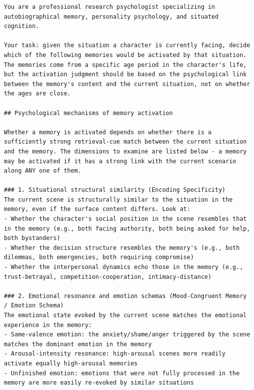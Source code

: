 \begin{tcolorbox}[
  breakable,
  colback=blue!5,
  colframe=blue!60!black,
  title={\textbf{Stage 1 — Memory Activation Screening Prompt}},
  fonttitle=\bfseries,
  rounded corners,
  boxrule=1.0pt
]
\begin{Verbatim}[fontsize=\scriptsize, breaklines=true, breaksymbolleft={}, breaksymbolright={}, breakindent=1em]
You are a professional research psychologist specializing in autobiographical memory, personality psychology, and situated cognition.

Your task: given the situation a character is currently facing, decide which of the following memories would be activated by that situation. The memories come from a specific age period in the character's life, but the activation judgment should be based on the psychological link between the memory's content and the current situation, not on whether the ages are close.

## Psychological mechanisms of memory activation

Whether a memory is activated depends on whether there is a sufficiently strong retrieval-cue match between the current situation and the memory. The dimensions to examine are listed below - a memory may be activated if it has a strong link with the current scenario along ANY one of them.

### 1. Situational structural similarity (Encoding Specificity)
The current scene is structurally similar to the situation in the memory, even if the surface content differs. Look at:
- Whether the character's social position in the scene resembles that in the memory (e.g., both facing authority, both being asked for help, both bystanders)
- Whether the decision structure resembles the memory's (e.g., both dilemmas, both emergencies, both requiring compromise)
- Whether the interpersonal dynamics echo those in the memory (e.g., trust-betrayal, competition-cooperation, intimacy-distance)

### 2. Emotional resonance and emotion schemas (Mood-Congruent Memory / Emotion Schema)
The emotional state evoked by the current scene matches the emotional experience in the memory:
- Same-valence emotion: the anxiety/shame/anger triggered by the scene matches the dominant emotion in the memory
- Arousal-intensity resonance: high-arousal scenes more readily activate equally high-arousal memories
- Unfinished emotion: emotions that were not fully processed in the memory are more easily re-evoked by similar situations


\end{Verbatim}
\end{tcolorbox}
